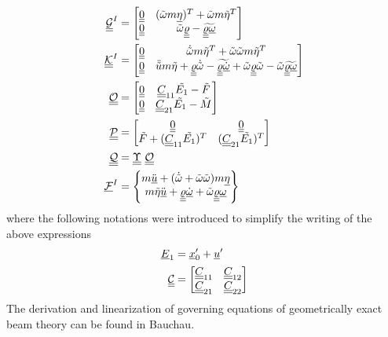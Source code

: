 \begin{align}
        \label{mathcalG}
        \underline{\underline{\mathcal{G}}}^I &= \begin{bmatrix}
        \underline{\underline{0}} & (\tilde{\omega} m \underline{\eta})^T+\tilde{\omega} m \tilde{\eta}^T  \\
        \underline{\underline{0}} & \tilde{\omega} \underline{\underline{\varrho}}-\widetilde{\underline{\underline{\varrho}} \underline{\omega}}
        \end{bmatrix} \\
        \label{mathcalK}
        \underline{\underline{\mathcal{K}}}^I &= \begin{bmatrix}
        \underline{\underline{0}} & \dot{\tilde{\omega}}m\tilde{\eta}^T + \tilde{\omega} \tilde{\omega}m\tilde{\eta}^T  \\
        \underline{\underline{0}} & \ddot{\tilde{u}}m\tilde{\eta} + \underline{\underline{\varrho}} \dot{\tilde{\omega}}-\widetilde{\underline{\underline{\varrho}} \underline{\dot{\omega}}}+\tilde{\omega} \underline{\underline{\varrho}} \tilde{\omega} - \tilde{\omega}  \widetilde{\underline{\underline{\varrho}} \underline{\omega}}
        \end{bmatrix}\\
	\label{mathcalO}
	\mathcal{\underline{\underline{O}}} &= \begin{bmatrix}
	\underline{\underline{0}} & \underline{\underline{C}}_{11} \tilde{E_1} - \tilde{F} \\
	\underline{\underline{0}}& \underline{\underline{C}}_{21} \tilde{E_1} - \tilde{M}
	\end{bmatrix} \\
	\label{mathcalP}
	\mathcal{\underline{\underline{P}}} &= \begin{bmatrix}
	\underline{\underline{0}} & \underline{\underline{0}} \\
	\tilde{F} +  (\underline{\underline{C}}_{11} \tilde{E_1})^T & (\underline{\underline{C}}_{21} \tilde{E_1})^T
	\end{bmatrix}  \\
	\label{mathcalQ}
	\mathcal{\underline{\underline{Q}}} &= \underline{\underline{\Upsilon}}~ \mathcal{\underline{\underline{O}}} \\
	\label{mathcalF}
	\underline{\mathcal{F}}^I &= \begin{Bmatrix}
	m \ddot{\underline{u}} + (\dot{\tilde{\omega}} + \tilde{\omega} \tilde{\omega})m \underline{\eta} \\
	m \tilde{\eta} \ddot{\underline{u}} +\underline{\underline{\varrho}}\dot{\underline{\omega}}+\tilde{\omega}\underline{\underline{\varrho}}\underline{\omega}
	\end{Bmatrix}
\end{align}
where the following notations were introduced to simplify the writing of the above expressions
\begin{align}
    \label{E1}
    \underline{E}_1 &= \underline{x}_0^\prime + \underline{u}^\prime \\
    \label{PartC}
    \underline{\underline{\mathcal{C}}} &= \begin{bmatrix}
    \underline{\underline{C}}_{11} & \underline{\underline{C}}_{12} \\
    \underline{\underline{C}}_{21} & \underline{\underline{C}}_{22}
    \end{bmatrix}
\end{align} 
The derivation and linearization of governing equations of geometrically
exact beam theory can be found in Bauchau\cite{Bauchau:2010}.

